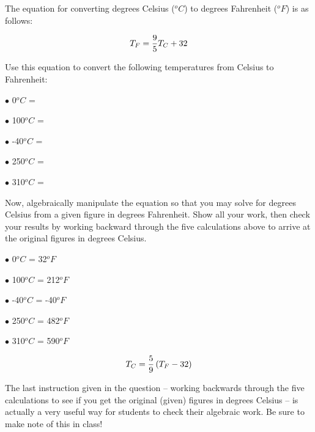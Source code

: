 

The equation for converting degrees Celsius ($^{o}C$) to degrees Fahrenheit ($^{o}F$) is as follows:

$$T_F = {9 \over 5}T_C + 32$$

Use this equation to convert the following temperatures from Celsius to Fahrenheit:

\medskip
\item{$\bullet$} 0$^{o}C$ = 
\item{$\bullet$} 100$^{o}C$ = 
\item{$\bullet$} -40$^{o}C$ = 
\item{$\bullet$} 250$^{o}C$ = 
\item{$\bullet$} 310$^{o}C$ = 
\medskip

Now, algebraically manipulate the equation so that you may solve for degrees Celsius from a given figure in degrees Fahrenheit.  Show all your work, then check your results by working backward through the five calculations above to arrive at the original figures in degrees Celsius.







\medskip
\item{$\bullet$} 0$^{o}C$ = 32$^{o}F$
\item{$\bullet$} 100$^{o}C$ = 212$^{o}F$
\item{$\bullet$} -40$^{o}C$ = -40$^{o}F$
\item{$\bullet$} 250$^{o}C$ = 482$^{o}F$
\item{$\bullet$} 310$^{o}C$ = 590$^{o}F$
\medskip

$$T_C = {5 \over 9} \left(T_F - 32\right)$$







The last instruction given in the question -- working backwards through the five calculations to see if you get the original (given) figures in degrees Celsius -- is actually a very useful way for students to check their algebraic work.  Be sure to make note of this in class!




